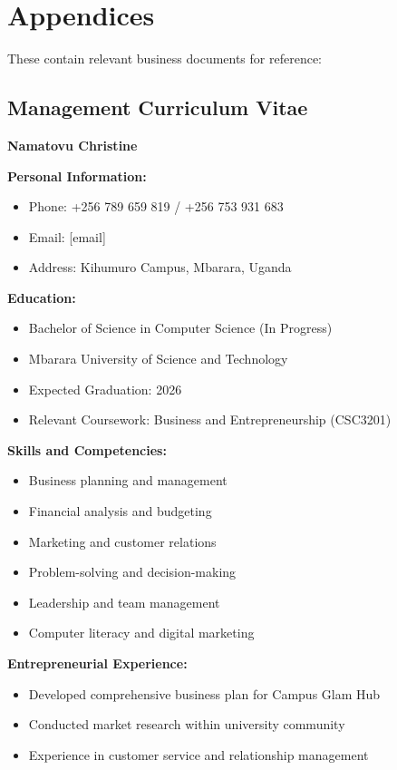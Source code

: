 \documentclass[a4paper,12pt]{article}
\begin{document}
\newpage
\section{Appendices}

These contain relevant business documents for reference:

\subsection{Management Curriculum Vitae}

\textbf{Namatovu Christine}

\textbf{Personal Information:}
\begin{itemize}[leftmargin=2em]
    \item Phone: +256 789 659 819 / +256 753 931 683
    \item Email: [email]
    \item Address: Kihumuro Campus, Mbarara, Uganda
\end{itemize}

\textbf{Education:}
\begin{itemize}[leftmargin=2em]
    \item Bachelor of Science in Computer Science (In Progress)
    \item Mbarara University of Science and Technology
    \item Expected Graduation: 2026
    \item Relevant Coursework: Business and Entrepreneurship (CSC3201)
\end{itemize}

\textbf{Skills and Competencies:}
\begin{itemize}[leftmargin=2em]
    \item Business planning and management
    \item Financial analysis and budgeting
    \item Marketing and customer relations
    \item Problem-solving and decision-making
    \item Leadership and team management
    \item Computer literacy and digital marketing
\end{itemize}

\textbf{Entrepreneurial Experience:}
\begin{itemize}[leftmargin=2em]
    \item Developed comprehensive business plan for Campus Glam Hub
    \item Conducted market research within university community
    \item Experience in customer service and relationship management
\end{itemize}
\end{document}
